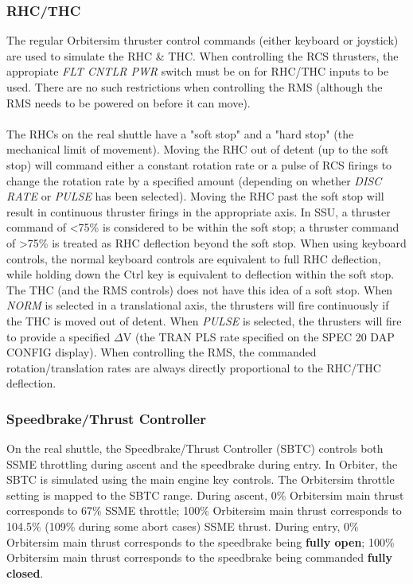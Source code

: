 \documentclass[13pt]{article}
\begin{document}
\begin{multicols*}{2}
\subsubsection{RHC/THC}
The regular Orbitersim thruster control commands (either keyboard or joystick) are used to simulate the RHC \& THC. When controlling the RCS thrusters, the appropiate \textit{FLT CNTLR PWR} switch must be on for RHC/THC inputs to be used. There are no such restrictions when controlling the RMS (although the RMS needs to be powered on before it can move).
\\
\\
The RHCs on the real shuttle have a "soft stop" and a "hard stop" (the mechanical limit of movement). Moving the RHC out of detent (up to the soft stop) will command either a constant rotation rate or a pulse of RCS firings to change the rotation rate by a specified amount (depending on whether \textit{DISC RATE} or \textit{PULSE} has been selected). Moving the RHC past the soft stop will result in continuous thruster firings in the appropriate axis. In SSU, a thruster command of <75\% is considered to be within the soft stop; a thruster command of >75\% is treated as RHC deflection beyond the soft stop. When using keyboard controls, the normal keyboard controls are equivalent to full RHC deflection, while holding down the Ctrl key is equivalent to deflection within the soft stop. The THC (and the RMS controls) does not have this idea of a soft stop. When \textit{NORM} is selected in a translational axis, the thrusters will fire continuously if the THC is moved out of detent. When \textit{PULSE} is selected, the thrusters will fire to provide a specified $\Delta$V (the TRAN PLS rate specified on the SPEC 20 DAP CONFIG display). When controlling the RMS, the commanded rotation/translation rates are always directly proportional to the RHC/THC deflection.

\subsubsection{Speedbrake/Thrust Controller}
On the real shuttle, the Speedbrake/Thrust Controller (SBTC) controls both SSME throttling during ascent and the speedbrake during entry. In Orbiter, the SBTC is simulated using the main engine key controls. The Orbitersim throttle setting is mapped to the SBTC range. During ascent, 0\% Orbitersim main thrust corresponds to 67\% SSME throttle; 100\% Orbitersim main thrust corresponds to 104.5\% (109\% during some abort cases) SSME thrust. During entry, 0\% Orbitersim main thrust corresponds to the speedbrake being \textbf{fully open}; 100\% Orbitersim main thrust corresponds to the speedbrake being commanded \textbf{fully closed}.


\end{multicols*}
\end{document}
